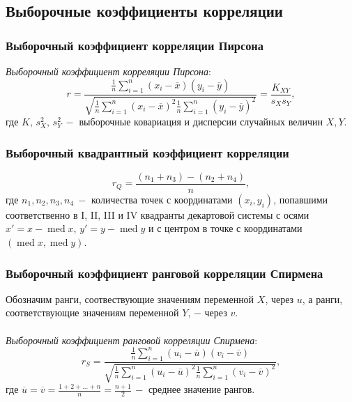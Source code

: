 \documentclass[a4paper,12pt]{article} %
\DeclareMathOperator{\med}{med}
\begin{document}
\subsection{Выборочные коэффициенты корреляции}
\subsubsection{Выборочный коэффициент корреляции Пирсона}
\textit{Выборочный коэффициент корреляции Пирсона}:
\begin{equation}
    r=\frac{\frac{1}{n}\sum_{i=1}^n \left(x_i-\overline{x}\right)\left(y_i-\overline{y}\right)}{\sqrt{\frac{1}{n}\sum_{i=1}^n\left(x_i-\overline{x}\right)^2 \frac{1}{n}\sum_{i=1}^n\left(y_i-\overline{y}\right)^2}}=\frac{K_{XY}}{s_X s_Y},
\end{equation}
где $K,\,s_X^2,\,s_Y^2\:-$ выборочные ковариация и дисперсии случайных величин $X, Y$.
\subsubsection{Выборочный квадрантный коэффициент корреляции}
\begin{equation}
    r_Q=\frac{(n_1+n_3)-(n_2+n_4)}{n},
\end{equation}
где $n_1,n_2,n_3,n_4\:-$ количества точек с координатами $(x_i,y_i)$, попавшими соответственно в I, II, III и IV квадранты декартовой системы с осями $x'=x-\med{x},\,y'=y-\med{y}$ и с центром в точке с координатами $(\med{x},\med{y})$.
\subsubsection{Выборочный коэффициент ранговой корреляции Спирмена}
Обозначим ранги, соотвествующие значениям переменной $X$, через $u$, а ранги, соответствующие значениям переменной $Y$, $-$ через $v$.
\\\\
\textit{Выборочный коэффициент ранговой корреляции Спирмена}:
\begin{equation}
    r_S=\frac{\frac{1}{n}\sum_{i=1}^n \left(u_i-\overline{u}\right)\left(v_i-\overline{v}\right)}{\sqrt{\frac{1}{n}\sum_{i=1}^n\left(u_i-\overline{u}\right)^2 \frac{1}{n}\sum_{i=1}^n\left(v_i-\overline{v}\right)^2}},
\end{equation}
где $\overline{u}=\overline{v}=\frac{1+2+...+n}{n}=\frac{n+1}{2}\,-$ среднее значение рангов.
\end{document}
